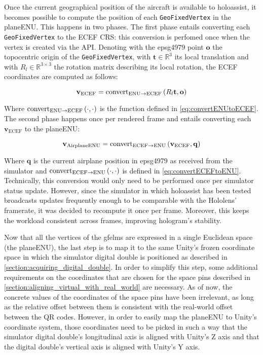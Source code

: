 Once the current geographical position of the aircraft is available to \gls{holoassist}, it becomes possible to compute the position of each \texttt{GeoFixedVertex} in the \gls{planeENU}. This happens in two phases. The first phase entails converting each \texttt{GeoFixedVertex} to the \gls{ECEF} \gls{CRS}: this conversion is perfomed once when the vertex is created via the \gls{API}. Denoting with the \gls{epsg4979} point $\mathbf{o}$ the topocentric origin of the \texttt{GeoFixedVertex}, with $\mathbf{t} \in \mathbb{R}^3$ its local translation and with $R_l \in \mathbb{R}^{3\times 3}$ the rotation matrix describing its local rotation, the \gls{ECEF} coordinates are computed as follows:

\begin{equation}
    \label{eq:externallinemeshvertextoecef}
    \mathbf{v}_{\text{ECEF}} = \text{convert}_{\text{ENU}\rightarrow\text{ECEF}}\left(R_l \mathbf{t}, \mathbf{o}\right)
\end{equation}

Where $\text{convert}_{\text{ENU}\rightarrow\text{ECEF}}\left(\cdot, \cdot\right)$ is the function defined in \autoref{eq:convertENUtoECEF}. The second phase happens once per rendered frame and entails converting each $\mathbf{v}_{\text{ECEF}}$ to the \gls{planeENU}:

\begin{equation}
    \mathbf{v_{\text{AirplaneENU}}} = \text{convert}_{\text{ECEF}\rightarrow\text{ENU}}\left(\mathbf{v}_{\text{ECEF}}, \mathbf{q}\right)
\end{equation}

Where $\mathbf{q}$ is the current airplane position in \gls{epsg4979} as received from the simulator and $\text{convert}_{\text{ECEF}\rightarrow\text{ENU}}\left(\cdot, \cdot\right)$ is defined in \autoref{eq:convertECEFtoENU}. Technically, this conversion would only need to be performed once per simulator status update. However, since the simulator in which \gls{holoassist} has been tested broadcasts updates frequently enough to be comparable with the Hololens' framerate, it was decided to recompute it once per frame. Moreover, this keeps the workload consistent across frames, improving hologram's stability\cite{microsoft_corporation_hologram_nodate}.

Now that all the vertices of the \glspl{gfelm} are expressed in a single Euclidean space (the \gls{planeENU}), the last step is to map it to the same Unity's frozen coordinate space in which the simulator digital double is positioned as described in \autoref{section:acquiring_digital_double}. In order to simplify this step, some additional requirements on the coordinates that are chosen for the space pins described in \autoref{section:aligning_virtual_with_real_world} are necessary. As of now, the concrete values of the coordinates of the space pins have been irrelevant, as long as the relative offset between them is consistent with the real-world offset between the QR codes. However, in order to easily map the \gls{planeENU} to Unity's coordinate system, those coordinates need to be picked in such a way that the simulator digital double's longitudinal axis is aligned with Unity's Z axis and that the digital double's vertical axis is aligned with Unity's Y axis.


